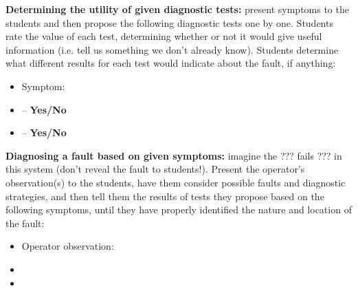 \vskip 10pt


\noindent
{\bf Determining the utility of given diagnostic tests:} present symptoms to the students and then propose the following diagnostic tests one by one.  Students rate the value of each test, determining whether or not it would give useful information (i.e. tell us something we don't already know).  Students determine what different results for each test would indicate about the fault, if anything:

\begin{itemize}
\item{} Symptom: {\it }
\item{}  -- {\bf Yes/No}
\item{}  -- {\bf Yes/No}
\end{itemize}


\vskip 10pt


\noindent
{\bf Diagnosing a fault based on given symptoms:} imagine the ??? fails ??? in this system (don't reveal the fault to students!).  Present the operator's observation(s) to the students, have them consider possible faults and diagnostic strategies, and then tell them the results of tests they propose based on the following symptoms, until they have properly identified the nature and location of the fault:

\begin{itemize}
\item{} Operator observation: {\it }
\item{} 
\item{} 
\end{itemize}




